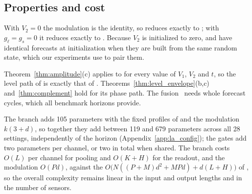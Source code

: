 {\subsection{Properties and cost}
\label{sec:ext_properties}

With $V_2=0$ the modulation is the identity, so \sysLA reduces exactly to \sysL; with $g_\ell=g_s=0$ it reduces exactly to \sysname. Because $V_2$ is initialized to zero, \sysLA and \sysL have identical forecasts at initialization when they are built from the same random state, which our experiments use to pair them.

Theorem~\ref{thm:amplitude}(c) applies to  for every value of $V_1$, $V_2$ and $t$, so the level path of \sysLA is exactly that of \sysL. Theorems~\ref{thm:level_envelope}(b,c) and~\ref{thm:complement} hold for its phase path. The fusion~ needs whole forecast cycles, which all benchmark horizons provide.

The branch adds 105 parameters with the fixed profiles of  and the modulation $k(3+d)$, so together they add between 119 and 679 parameters across all 28 settings, independently of the horizon (Appendix~\ref{app:la_config}); the gates add two parameters per channel, or two in total when shared. The branch costs $O(L)$ per channel for pooling and $O(K+H)$ for the readout, and the modulation $O(Pd)$, against the $O\big(N((P+M)d^2+MPd)+d(L+H)\big)$ of \sysname, so the overall complexity remains linear in the input and output lengths and in the number of sensors.
}
